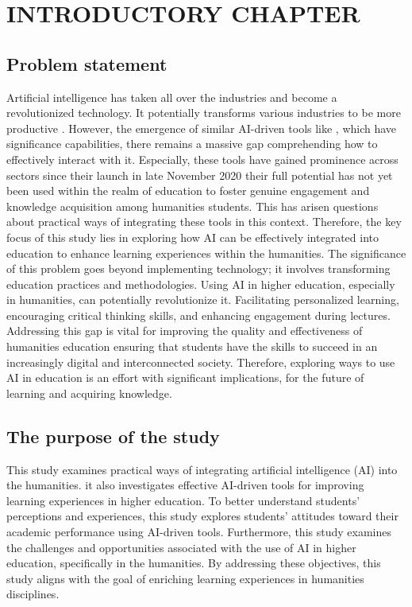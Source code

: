 \chapter{INTRODUCTORY CHAPTER}\label{ch:introductory-chapter}
\section{Problem statement}\label{sec:problem-statement}
\justifying
Artificial intelligence has taken all over the industries and become a revolutionized technology.
It potentially transforms various industries to be more productive \textcite{Dirk_Czarnitzki}.
However, the emergence of similar AI-driven tools like , which have significance
capabilities, there remains a massive gap comprehending how to effectively
interact with it.
Especially, these tools have gained prominence across
sectors since their launch in late November 2020 \textcite{MarrB_2023} their full potential
has not yet been used within the realm of education to foster genuine
engagement and knowledge acquisition among humanities students.
This has arisen questions about practical ways of integrating these tools in this context.
Therefore, the key focus of this study lies in exploring how AI can be effectively integrated into education
to enhance learning experiences within the humanities.
The significance of this problem goes beyond implementing technology;
it involves transforming education practices and methodologies.
Using AI in higher education, especially in humanities, can potentially
revolutionize it.
Facilitating personalized learning, encouraging critical thinking skills, and
enhancing engagement during lectures.
Addressing this gap is vital for improving the quality and effectiveness of humanities education ensuring
that students have the skills to succeed in an increasingly digital and interconnected society.
Therefore, exploring ways to use AI in education is an effort with significant implications,
for the future of learning and acquiring knowledge.
\section{The purpose of the study}\label{sec:the-purpose-of-the-study}
\justifying
This study examines practical ways of integrating artificial intelligence (AI) into the humanities.
it also investigates effective AI-driven tools for improving learning experiences in higher education.
To better understand students’ perceptions and experiences, this study explores students’ attitudes toward their academic performance using AI-driven tools.
Furthermore, this study examines the challenges and opportunities associated with the use of AI in higher education, specifically in the humanities.
By addressing these objectives, this study aligns with the goal of enriching learning experiences in humanities disciplines.

